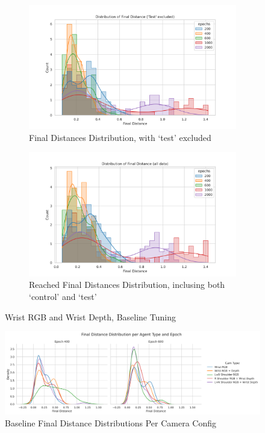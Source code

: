 \begin{figure}[H]
  \centering
  \begin{subfigure}{0.45\linewidth}
    \centering
    \includegraphics[width=\linewidth]{assets/evaluation/rnn/wd-epoch-test-final.png}
    \caption{Final Distances Distribution, with `test' excluded}\label{subfig:rnn-grasp-final}
  \end{subfigure}
  \hfill
  \begin{subfigure}{0.45\linewidth}
    \centering
    \includegraphics[width=\linewidth]{assets/evaluation/rnn/wdw-epoch-test-all-final.png}
    \caption{Reached Final Distances Distribution, inclusing both `control' and `test'}\label{subfig:rnn-grasp-final}
  \end{subfigure}
  \caption{Wrist RGB and Wrist Depth, Baseline Tuning}\label{fig:rnn-grasp-final-wd}
\end{figure}

\begin{figure}[H]
  \centering
  \includegraphics[width=0.8\linewidth]{assets/evaluation/rnn/400-600-cams.png}
  \caption{Baseline Final Distance Distributions Per Camera Config }\label{fig:rnn-grasp-tuning}
\end{figure}

